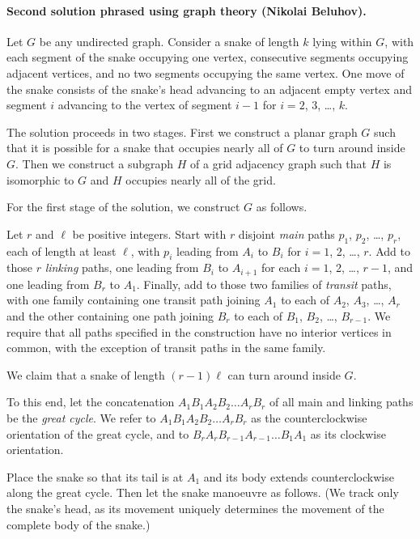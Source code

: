 \paragraph{Second solution phrased using graph theory (Nikolai Beluhov).}
Let $G$ be any undirected graph. Consider a snake of length $k$ lying within $G$, with each segment of the snake occupying one vertex, consecutive segments occupying adjacent vertices, and no two segments occupying the same vertex. One move of the snake consists of the snake's head advancing to an adjacent empty vertex and segment $i$ advancing to the vertex of segment $i - 1$ for $i = 2$, 3, \dots, $k$.

The solution proceeds in two stages. First we construct a planar graph $G$ such that it is possible for a snake that occupies nearly all of $G$ to turn around inside $G$. Then we construct a subgraph $H$ of a grid adjacency graph such that $H$ is isomorphic to $G$ and $H$ occupies nearly all of the grid.

For the first stage of the solution, we construct $G$ as follows.

Let $r$ and $\ell$ be positive integers. Start with $r$ disjoint \emph{main} paths $p_1$, $p_2$, \dots, $p_r$, each of length at least $\ell$, with $p_i$ leading from $A_i$ to $B_i$ for $i = 1$, 2, \dots, $r$. Add to those $r$ \emph{linking} paths, one leading from $B_i$ to $A_{i + 1}$ for each $i = 1$, 2, \dots, $r - 1$, and one leading from $B_r$ to $A_1$. Finally, add to those two families of \emph{transit} paths, with one family containing one transit path joining $A_1$ to each of $A_2$, $A_3$, \dots, $A_r$ and the other containing one path joining $B_r$ to each of $B_1$, $B_2$, \dots, $B_{r - 1}$. We require that all paths specified in the construction have no interior vertices in common, with the exception of transit paths in the same family.

We claim that a snake of length $(r - 1)\ell$ can turn around inside $G$.

To this end, let the concatenation $A_1B_1A_2B_2\dots A_r B_r$ of all main and linking paths be the \emph{great cycle}. We refer to $A_1B_1A_2B_2\dots A_r B_r$ as the counterclockwise orientation of the great cycle, and to $B_r A_r B_{r - 1}A_{r - 1}\dots B_1A_1$ as its clockwise orientation.

Place the snake so that its tail is at $A_1$ and its body extends counterclockwise along the great cycle. Then let the snake manoeuvre as follows. (We track only the snake's head, as its movement uniquely determines the movement of the complete body of the snake.)

